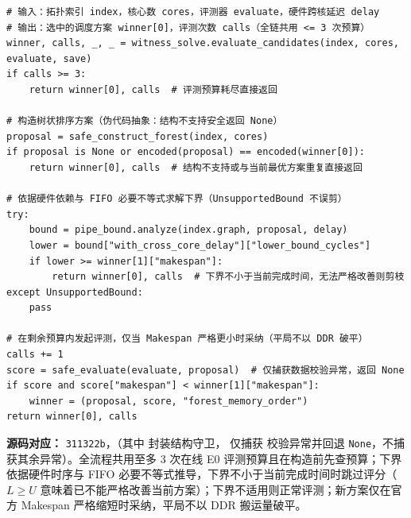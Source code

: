 \documentclass[anonymous,withtoc]{gmcm2026}
\renewcommand{\thealgorithm}{\thesection-\arabic{algorithm}}
\begin{document}
\FloatBarrier
\FloatBarrier\par{}\begingroup\normalsize
\captionsetup{type=algorithm,position=top,justification=raggedright,singlelinecheck=false,labelfont=bf}
\label{alg:p3-forest-solve}
\begin{tcolorbox}[enhanced,breakable,colback=white,colframe=black,
  boxrule=0pt,toprule=.4pt,bottomrule=.4pt,sharp corners,boxsep=0pt,
  left=0pt,right=0pt,top=4pt,bottom=4pt,before skip=2pt,after skip=2pt,
  title after break={算法~\thealgorithm（续）},
  colbacktitle=white,coltitle=black,fonttitle=\normalsize\bfseries]



\begin{lstlisting}[style=paperpseudo]
# 输入：拓扑索引 index，核心数 cores，评测器 evaluate，硬件跨核延迟 delay
# 输出：选中的调度方案 winner[0]，评测次数 calls（全链共用 <= 3 次预算）
winner, calls, _, _ = witness_solve.evaluate_candidates(index, cores, evaluate, save)
if calls >= 3:
    return winner[0], calls  # 评测预算耗尽直接返回

# 构造树状排序方案（伪代码抽象：结构不支持安全返回 None）
proposal = safe_construct_forest(index, cores)
if proposal is None or encoded(proposal) == encoded(winner[0]):
    return winner[0], calls  # 结构不支持或与当前最优方案重复直接返回

# 依据硬件依赖与 FIFO 必要不等式求解下界（UnsupportedBound 不误剪）
try:
    bound = pipe_bound.analyze(index.graph, proposal, delay)
    lower = bound["with_cross_core_delay"]["lower_bound_cycles"]
    if lower >= winner[1]["makespan"]:
        return winner[0], calls  # 下界不小于当前完成时间，无法严格改善则剪枝
except UnsupportedBound:
    pass

# 在剩余预算内发起评测，仅当 Makespan 严格更小时采纳（平局不以 DDR 破平）
calls += 1
score = safe_evaluate(evaluate, proposal)  # 仅捕获数据校验异常，返回 None
if score and score["makespan"] < winner[1]["makespan"]:
    winner = (proposal, score, "forest_memory_order")
return winner[0], calls
\end{lstlisting}
\textbf{源码对应：} \texttt{311322b}，\texttt{}（其中 \texttt{} 封装结构守卫，\texttt{} 仅捕获 \texttt{} 校验异常并回退 \texttt{None}，不捕获其余异常）。全流程共用至多 3 次在线 E0 评测预算且在构造前先查预算；下界依据硬件时序与 FIFO 必要不等式推导，下界不小于当前完成时间时跳过评分（\(L \ge U\) 意味着已不能严格改善当前方案）；下界不适用则正常评测；新方案仅在官方 Makespan 严格缩短时采纳，平局不以 DDR 搬运量破平。

\end{tcolorbox}\endgroup
\end{document}
